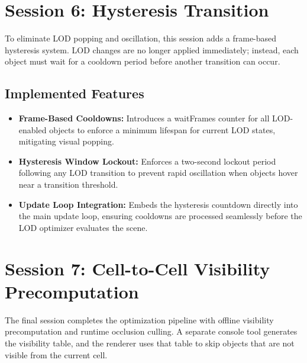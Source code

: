 \documentclass[a4paper]{article}
\begin{document}
\section{Session 6: Hysteresis Transition}

To eliminate LOD popping and oscillation, this session adds a frame-based hysteresis system. LOD changes are no longer applied immediately; instead, each object must wait for a cooldown period before another transition can occur.

\subsection{Implemented Features}
\begin{itemize}[noitemsep]
    \item \textbf{Frame-Based Cooldowns:} Introduces a waitFrames counter for all LOD-enabled objects to enforce a minimum lifespan for current LOD states, mitigating visual popping.
    \item \textbf{Hysteresis Window Lockout:} Enforces a two-second lockout period following any LOD transition to prevent rapid oscillation when objects hover near a transition threshold.
    \item \textbf{Update Loop Integration:} Embeds the hysteresis countdown directly into the main update loop, ensuring cooldowns are processed seamlessly before the LOD optimizer evaluates the scene.
\end{itemize}

\newpage
\section{Session 7: Cell-to-Cell Visibility Precomputation}

The final session completes the optimization pipeline with offline visibility precomputation and runtime occlusion culling. A separate console tool generates the visibility table, and the renderer uses that table to skip objects that are not visible from the current cell.
\end{document}
